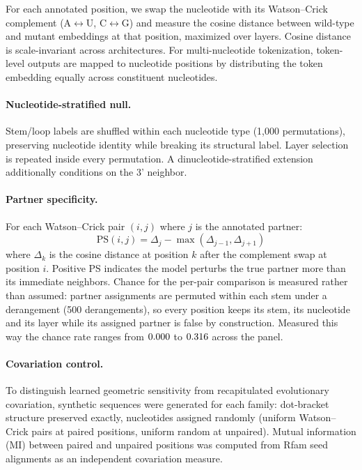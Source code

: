 \documentclass[11pt]{article}
\begin{document}
For each annotated position, we swap the nucleotide with its Watson--Crick
complement (A$\leftrightarrow$U, C$\leftrightarrow$G) and measure the cosine
distance between wild-type and mutant embeddings at that position, maximized
over layers. Cosine distance is scale-invariant across architectures.
For multi-nucleotide tokenization, token-level outputs are mapped to
nucleotide positions by distributing the token embedding equally across
constituent nucleotides.

\paragraph{Nucleotide-stratified null.}
Stem/loop labels are shuffled within each nucleotide type (1{,}000
permutations), preserving nucleotide identity while breaking its structural
label. Layer selection is repeated inside every permutation. A
dinucleotide-stratified extension additionally conditions on the 3' neighbor.

\paragraph{Partner specificity.}
\label{sec:ps-method}
For each Watson--Crick pair $(i, j)$ where $j$ is the annotated partner:
\[
\text{PS}(i,j) = \Delta_j - \max(\Delta_{j-1}, \Delta_{j+1})
\]
where $\Delta_k$ is the cosine distance at position $k$ after the complement
swap at position $i$. Positive PS indicates the model perturbs the true
partner more than its immediate neighbors. Chance for the per-pair comparison
is measured rather than assumed: partner assignments are permuted within each
stem under a derangement (500 derangements), so every position keeps its stem,
its nucleotide and its layer while its assigned partner is false by
construction. Measured this way the chance rate ranges from
$0.000{}$ to $0.316{}$ across the panel.

\paragraph{Covariation control.}
To distinguish learned geometric sensitivity from recapitulated evolutionary
covariation, synthetic sequences were generated for each family: dot-bracket
structure preserved exactly, nucleotides assigned randomly (uniform
Watson--Crick pairs at paired positions, uniform random at unpaired). Mutual
information (MI) between paired and unpaired positions was computed from Rfam
seed alignments as an independent covariation measure.
\end{document}
